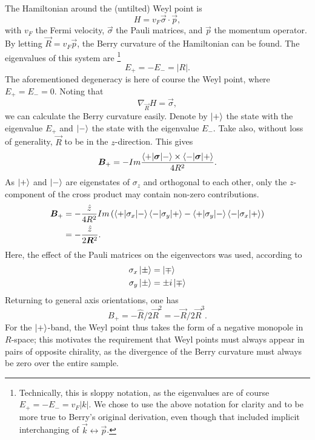 The Hamiltonian around the (untilted) Weyl point is
\begin{equation}
  H = v_F \vec{\sigma} \cdot \vec{p},
\end{equation}
with $v_F$ the Fermi velocity, $\vec{\sigma}$ the Pauli matrices, and $\vec{p}$ the momentum operator.
By letting $\vec{R} = v_F \vec{p}$, the Berry curvature of the Hamiltonian can be found.
The eigenvalues of this system are%
\footnote{Technically, this is sloppy notation, as the eigenvalues are of course \( E_+ = -E_- = v_F |k| \). We chose to use the above notation for clarity and to be more true to Berry's original derivation, even though that included implicit interchanging of \( \vec{k} \leftrightarrow \vec{p} \).}
\begin{equation}
    E_+ = -E_-
    = |R|.
\end{equation}
The aforementioned degeneracy is here of course the Weyl point, where $E_+ = E_- = 0$.
Noting that
\begin{equation}
  \label{eq:gradHamil}
  \nabla_{\vec{R}} H = \vec\sigma,
\end{equation}
we can calculate the Berry curvature easily.
Denote by $\ket{+}$ the state with the eigenvalue $E_+$ and $\ket{-}$ the state with the eigenvalue $E_-$.
Take also, without loss of generality, $\vec{R}$ to be in the $z$-direction.
This gives
\begin{equation}
  \bm{B}_+ = -Im
  \frac{
    \braket{+ | \bm\sigma | -}
    \times
    \braket{- | \bm\sigma | +}
  }{
    4 R^2
  }.
\end{equation}
As $\ket{+}$ and $\ket{-}$ are eigenstates of $\sigma_z$ and orthogonal to each other, only the $z$-component of the cross product may contain non-zero contributions.
\begin{equation}
  \begin{split}
    \bm{B}_+ &= - \frac{\hat{z}}{4 R^2}
    Im \left(
    \braket{+ | \sigma_x | -}
    \braket{- | \sigma_y | +}
    -
    \braket{+ | \sigma_y | -}
    \braket{- | \sigma_x | +}
    \right)\\
    &= - \frac{ \hat{z}}{2 \bm{R}^2}.
  \end{split}
\end{equation}
Here, the effect of the Pauli matrices on the eigenvectors was used, according to
\begin{align}
  \sigma_x \ket{\pm} &= \ket{\mp}\\
  \sigma_y \ket{\pm} &= \pm i \ket{\mp}
\end{align}
Returning to general axis orientations, one has
\begin{equation}
  B_+ = - \hat{R} / 2\vec{R}^2 = - \vec{R} / 2 \vec{R}^3.
\end{equation}
For the $\ket{+}$-band, the Weyl point thus takes the form of a negative monopole in $R$-space;
this motivates the requirement that Weyl points must always appear in pairs of opposite chirality, as the divergence of the Berry curvature must always be zero over the entire sample.

